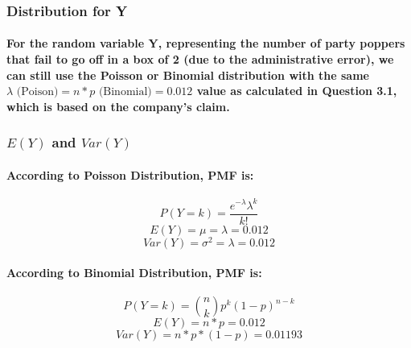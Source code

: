 \subsubsection{Distribution for Y}
\paragraph{For the random variable Y, representing the number of party poppers that fail to go off in a box of 2 (due to the administrative error), we can still use the Poisson or Binomial distribution with the same $\lambda \text{ (Poison)}=n*p \text{ (Binomial)}=0.012$ value as calculated in Question 3.1, which is based on the company's claim.}

\subsubsection{$E(Y)$ and $Var(Y)$}
\paragraph{According to Poisson Distribution, PMF is:}
$$ P(Y=k)=\frac{e^{- \lambda} \lambda^k}{k!} $$
$$ E(Y)= \mu = \lambda =0.012 $$
$$ Var(Y) = \sigma^2 = \lambda=0.012 $$
\paragraph{According to Binomial Distribution, PMF is:}
$$ P(Y=k)= \binom{n}{k} p^k (1 - p)^{n - k}$$
$$ E(Y)= n*p =0.012 $$
$$ Var(Y) =n*p*(1-p)=0.01193 $$